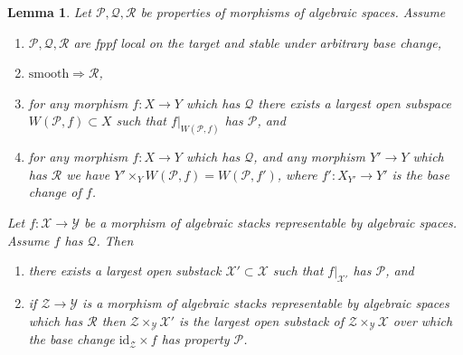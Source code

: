 \documentclass[10pt,a4paper]{amsart}
\theoremstyle{plain}
\newtheorem{lemma}[subsection]{Lemma}
\theoremstyle{definition}
\theoremstyle{remark}
\numberwithin{equation}{subsection}
\begin{document}
\begin{lemma}
\label{lemma-local-source}
Let $\mathcal{P}, \mathcal{Q}, \mathcal{R}$ be properties of morphisms
of algebraic spaces. Assume
\begin{enumerate}
\item $\mathcal{P}, \mathcal{Q}, \mathcal{R}$ are fppf local on the target
and stable under arbitrary base change,
\item $\text{smooth} \Rightarrow \mathcal{R}$,
\item for any morphism $f : X \to Y$ which has $\mathcal{Q}$ there exists a
largest open subspace $W(\mathcal{P}, f) \subset X$ such that
$f|_{W(\mathcal{P}, f)}$ has $\mathcal{P}$, and
\item for any morphism $f : X \to Y$ which has $\mathcal{Q}$,
and any morphism $Y' \to Y$ which has $\mathcal{R}$ we have
$Y' \times_Y W(\mathcal{P}, f) = W(\mathcal{P}, f')$, where
$f' : X_{Y'} \to Y'$ is the base change of $f$.
\end{enumerate}
Let $f : \mathcal{X} \to \mathcal{Y}$ be a morphism of algebraic stacks
representable by algebraic spaces. Assume $f$ has $\mathcal{Q}$. Then
\begin{enumerate}
\item[(A)] there exists a largest open substack
$\mathcal{X}' \subset \mathcal{X}$ such that $f|_{\mathcal{X}'}$ has
$\mathcal{P}$, and
\item[(B)] if $\mathcal{Z} \to \mathcal{Y}$ is a morphism of algebraic
stacks representable by algebraic spaces which has $\mathcal{R}$
then $\mathcal{Z} \times_\mathcal{Y} \mathcal{X}'$ is the largest open
substack of $\mathcal{Z} \times_\mathcal{Y} \mathcal{X}$ over which
the base change $\text{id}_\mathcal{Z} \times f$ has property $\mathcal{P}$.
\end{enumerate}
\end{lemma}
\end{document}
